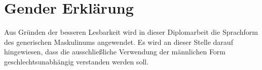 \section*{Gender Erklärung}

Aus Gründen der besseren Lesbarkeit wird in dieser Diplomarbeit  die Sprachform des generischen Maskulinums angewendet. Es wird an dieser Stelle darauf hingewiesen, dass die ausschließliche Verwendung der männlichen Form geschlechtsunabhängig verstanden werden soll.